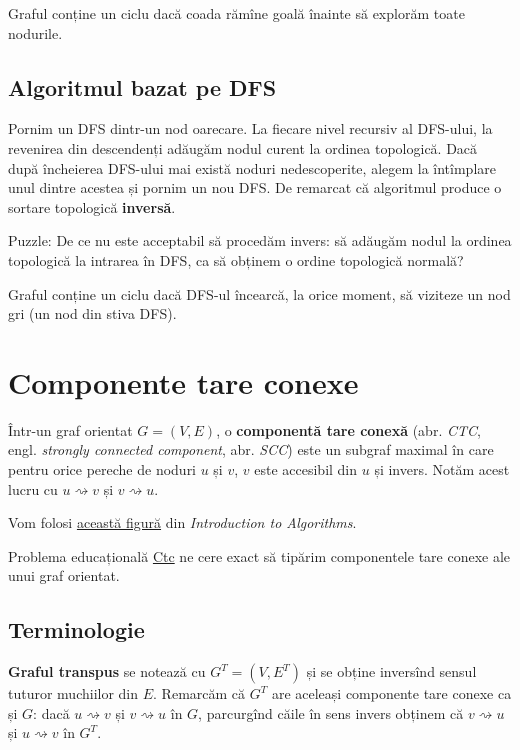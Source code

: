 \documentclass[../main.tex]{subfiles}
\begin{document}
Graful conține un ciclu dacă coada rămîne goală înainte să explorăm toate nodurile.

\subsection{Algoritmul bazat pe DFS}

Pornim un DFS dintr-un nod oarecare. La fiecare nivel recursiv al DFS-ului, la revenirea din descendenți adăugăm nodul curent la ordinea topologică. Dacă după încheierea DFS-ului mai există noduri nedescoperite, alegem la întîmplare unul dintre acestea și pornim un nou DFS. De remarcat că algoritmul produce o sortare topologică \textbf{inversă}.

Puzzle: De ce nu este acceptabil să procedăm invers: să adăugăm nodul la ordinea topologică la intrarea în DFS, ca să obținem o ordine topologică normală?

Graful conține un ciclu dacă DFS-ul încearcă, la orice moment, să viziteze un nod gri (un nod din stiva DFS).

\section{Componente tare conexe}

Într-un graf orientat $G = (V, E)$, o \textbf{componentă tare conexă} (abr. \textit{CTC}, engl. \textit{strongly connected component}, abr. \textit{SCC}) este un subgraf maximal în care pentru orice pereche de noduri $u$ și $v$, $v$ este accesibil din $u$ și invers. Notăm acest lucru cu $u \rightsquigarrow v$ și $v \rightsquigarrow u$.

Vom folosi \href{https://dl.ebooksworld.ir/books/Introduction.to.Algorithms.4th.Leiserson.Stein.Rivest.Cormen.MIT.Press.9780262046305.EBooksWorld.ir.pdf#page=599}{această figură} din \textit{Introduction to Algorithms}.

Problema educațională \hyperref[problem:ctc]{Ctc} ne cere exact să tipărim componentele tare conexe ale unui graf orientat.

\subsection{Terminologie}

\textbf{Graful transpus} se notează cu $G^{T} = (V, E^{T})$ și se obține inversînd sensul tuturor muchiilor din $E$. Remarcăm că $G^{T}$ are aceleași componente tare conexe ca și $G$: dacă $u \rightsquigarrow v$ și $v \rightsquigarrow u$ în $G$, parcurgînd căile în sens invers obținem că $v \rightsquigarrow u$ și $u \rightsquigarrow v$ în $G^{T}$.
\end{document}
